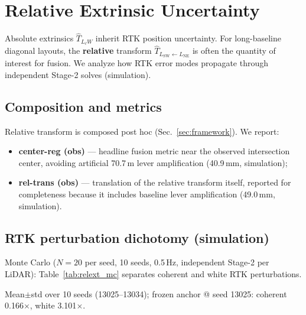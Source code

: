 \section{Relative Extrinsic Uncertainty}
\label{sec:relext}

Absolute extrinsics $\hat{T}_{L_\ell W}$ inherit RTK position uncertainty.
For long-baseline diagonal layouts, the \textbf{relative} transform
$\hat{T}_{L_{\mathrm{SW}}\leftarrow L_{\mathrm{NE}}}$ is often the quantity of
interest for fusion.
We analyze how RTK error modes propagate through independent Stage-2 solves
(simulation).

\subsection{Composition and metrics}
Relative transform is composed post hoc (Sec.~\ref{sec:framework}).
We report:
\begin{itemize}
  \item \textbf{center-reg (obs)} --- headline fusion metric near the observed
    intersection center, avoiding artificial 70.7\,m lever amplification
    (40.9\,mm, simulation);
  \item \textbf{rel-trans (obs)} --- translation of the relative transform itself,
    reported for completeness because it includes baseline lever amplification
    (49.0\,mm, simulation).
\end{itemize}

\subsection{RTK perturbation dichotomy (simulation)}
Monte Carlo ($N{=}20$ per seed, 10 seeds, \flightW{} 0.5\,Hz, independent Stage-2 per LiDAR):
Table~\ref{tab:relext_mc} separates coherent and white RTK perturbations.

\begin{table}[!t]
  \centering
  \caption{RTK injection causal chain (simulation).}
  \label{tab:relext_mc}
  \footnotesize
  \vspace{1mm}

  {\footnotesize Mean$\pm$std over 10 seeds (13025--13034);
  frozen anchor @ seed 13025: coherent 0.166$\times$, white 3.101$\times$.}
\end{table}

